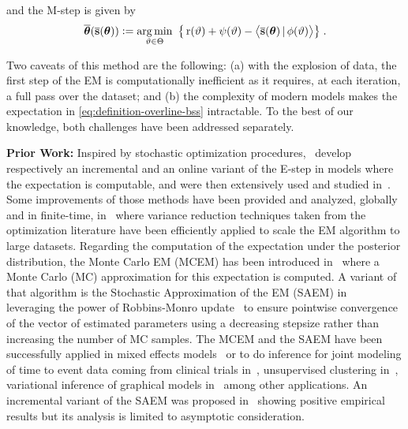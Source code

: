 \documentclass[conference,letterpaper]{IEEEtran}
\begin{document}
and the \textsf{M-step} is given by
\begin{align}\label{eq:mstep}
\overline{\param}( \overline{\bss}(\param) ) \eqdef \argmin_{ \vartheta \in \Param } ~\big\{ \Pen( \vartheta ) + \psi( \vartheta) - \pscal{ \overline{\bss}(\param)}{ \phi ( \vartheta) } \big\} \eqsp.
\end{align}


Two caveats of this method are the following: {\sf(a)} with the explosion of data, the first step of the EM is computationally inefficient as it requires, at each iteration, a full pass over the dataset; and {\sf(b)} the complexity of modern models makes the expectation in \eqref{eq:definition-overline-bss} intractable. 
To the best of our knowledge, both challenges have been addressed separately.

\vspace{0.08in}
\noindent \textbf{Prior Work:} Inspired by stochastic optimization procedures,~\cite{neal1998view,cappe2009line} develop respectively an incremental and an online variant of the \textsf{E-step} in models where the expectation is computable, and were then extensively used and studied in~\cite{nguyen2020mini, liang2009online,cappe2011online}.
Some improvements of those methods have been provided and analyzed, globally and in finite-time, in~\cite{karimi2019global} where variance reduction techniques taken from the optimization literature have been efficiently applied to scale the EM algorithm to large datasets.
Regarding the computation of the expectation under the posterior distribution, the Monte Carlo EM (MCEM) has been introduced in~\cite{wei1990monte} where a Monte Carlo (MC) approximation for this expectation is computed. A variant of that algorithm is the Stochastic Approximation of the EM (SAEM) in~\cite{delyon1999} leveraging the power of Robbins-Monro update~\cite{robbins1951stochastic} to ensure pointwise convergence of the vector of estimated parameters using a decreasing stepsize rather than increasing the number of MC samples.
The MCEM and the SAEM have been successfully applied in mixed effects models~\cite{mcculloch1997maximum,hughes1999mixed,baey2016nonlinear} or to do inference for joint modeling of time to event data coming from clinical trials in~\cite{das2010Inferences}, unsupervised clustering in~\cite{ngChoice2003}, variational inference of graphical models in~\cite{BleiVariational2017} among other applications.
An incremental variant of the SAEM was proposed in~\cite{kuhn2019properties} showing positive empirical results but its analysis is limited to asymptotic consideration. 
\end{document}

